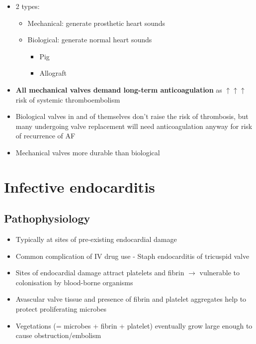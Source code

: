 \documentclass[
  12pt,
]{memoir}
\providecommand{\tightlist}{%
  \setlength{\itemsep}{0pt}\setlength{\parskip}{0pt}}
\begin{document}
\begin{itemize}
\tightlist
\item
  2 types:

  \begin{itemize}
  \tightlist
  \item
    Mechanical: generate prosthetic heart sounds
  \item
    Biological: generate normal heart sounds

    \begin{itemize}
    \tightlist
    \item
      Pig
    \item
      Allograft
    \end{itemize}
  \end{itemize}
\item
  \textbf{All mechanical valves demand long-term anticoagulation} as
  \(\uparrow  \uparrow\uparrow\) risk of systemic thromboembolism
\item
  Biological valves in and of themselves don't raise the risk of
  thrombosis, but many undergoing valve replacement will need
  anticoagulation anyway for risk of recurrence of AF
\item
  Mechanical valves more durable than biological
\end{itemize}

\hypertarget{infective-endocarditis}{%
\section{Infective endocarditis}\label{infective-endocarditis}}

\hypertarget{pathophysiology-2}{%
\subsection{Pathophysiology}\label{pathophysiology-2}}

\begin{itemize}
\tightlist
\item
  Typically at sites of pre-existing endocardial damage
\item
  Common complication of IV drug use - Staph endocarditis of tricuspid
  valve
\item
  Sites of endocardial damage attract platelets and fibrin
  \(\rightarrow\) vulnerable to colonisation by blood-borne organisms
\item
  Avascular valve tissue and presence of fibrin and platelet aggregates
  help to protect proliferating microbes
\item
  Vegetations (= microbes + fibrin + platelet) eventually grow large
  enough to cause obstruction/embolism
\end{itemize}
\end{document}
